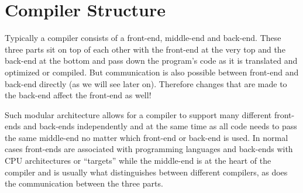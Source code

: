 \chapter{Compiler Structure}
\label{chapter:compiler structure}
\newlength\Colsep
\setlength\Colsep{10pt}
Typically a compiler consists of a front-end, middle-end and back-end. These three parts
sit on top of each other with the front-end at the very top and the back-end at the bottom
and pass down the program’s code as it is translated and optimized or compiled. But
communication is also possible between front-end and back-end directly (as we will see
later on). Therefore changes that are made to the back-end affect the front-end as well!

Such modular architecture allows for a compiler to support many different front-ends
and back-ends independently and at the same time as all code needs to pass the same
middle-end no matter which front-end or back-end is used. In normal cases front-ends
are associated with programming languages and back-ends with CPU architectures or
“targets” while the middle-end is at the heart of the compiler and is usually what distinguishes between different compilers, as does the communication between the three
parts.

